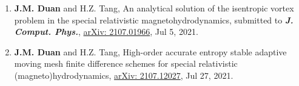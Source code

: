 \begin{enumerate}
  \item[\circenum] {\bfseries J.M. Duan} and H.Z. Tang, An analytical solution of the isentropic vortex problem in the special relativistic magnetohydrodynamics,
  submitted to {\em\bfseries J. Comput. Phys.},
  \href{https://arxiv.org/abs/2107.01966}{arXiv: 2107.01966}, Jul 5, 2021.
  \item[\circenum] {\bfseries J.M. Duan} and H.Z. Tang, High-order accurate entropy stable adaptive moving mesh finite difference schemes for special relativistic (magneto)hydrodynamics,
  \href{https://arxiv.org/abs/2107.12027}{arXiv: 2107.12027}, Jul 27, 2021.
\end{enumerate}

